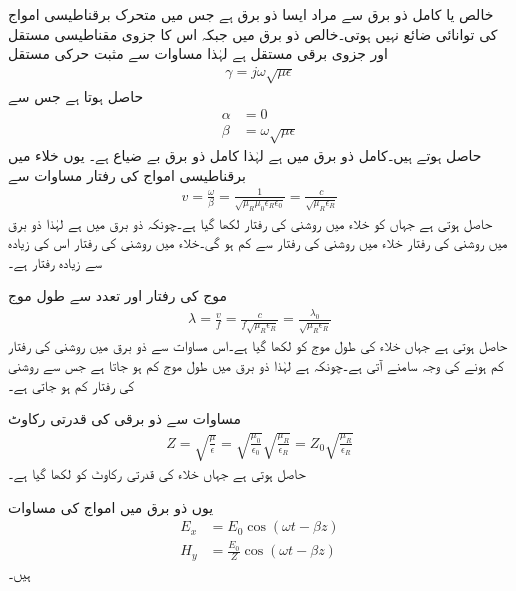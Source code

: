 خالص یا کامل ذو برق سے مراد ایسا ذو برق ہے جس میں متحرک برقناطیسی امواج کی توانائی ضائع نہیں ہوتی۔خالص ذو برق میں  جبکہ اس کا جزوی مقناطیسی مستقل  اور جزوی برقی مستقل   ہے لہٰذا مساوات  سے مثبت حرکی مستقل
\begin{align*}
\gamma=j \omega \sqrt{\mu \epsilon }
\end{align*}
حاصل ہوتا ہے جس سے
\begin{align}
\alpha&=0\\
\beta&=\omega \sqrt{\mu \epsilon} \label{مساوات_موج_کامل-ذوبرق_بیٹا}
\end{align}
حاصل ہوتے ہیں۔کامل ذو برق میں  ہے لہٰذا کامل ذو برق بے ضیاع ہے۔ یوں خلاء میں برقناطیسی امواج کی رفتار  مساوات  سے
\begin{align}
v=\frac{\omega}{\beta}=\frac{1}{\sqrt{\mu_R \mu_0 \epsilon_R \epsilon_0}}=\frac{c}{\sqrt{\mu_R \epsilon_R}}
\end{align} 
حاصل ہوتی ہے جہاں  کو خلاء میں روشنی کی رفتار  لکھا گیا ہے۔چونکہ ذو برق میں  ہے  لہٰذا ذو برق میں روشنی کی رفتار خلاء میں روشنی کی رفتار سے کم ہو گی۔خلاء میں روشنی کی رفتار اس کی زیادہ سے زیادہ رفتار ہے۔

موج کی رفتار اور تعدد سے طول موج
\begin{align}
\lambda=\frac{v}{f}=\frac{c}{f \sqrt{\mu_R \epsilon_R}}=\frac{\lambda_0}{\sqrt{\mu_R \epsilon_R}}
\end{align}
حاصل ہوتی ہے جہاں خلاء کی طول موج کو  لکھا گیا ہے۔اس مساوات سے ذو برق میں روشنی کی رفتار کم ہونے کی وجہ سامنے آتی ہے۔چونکہ  ہے لہٰذا ذو برق میں طول موج کم ہو جاتا ہے جس سے روشنی کی رفتار کم ہو جاتی ہے۔


مساوات  سے ذو برقی کی  قدرتی رکاوٹ
\begin{align*}
Z =\sqrt{\frac{\mu}{\epsilon}}=\sqrt{\frac{\mu_0}{\epsilon_0}}\sqrt{\frac{\mu_R}{\epsilon_R}}= Z_0 \sqrt{\frac{\mu_R}{\epsilon_R}}
\end{align*}
حاصل ہوتی ہے جہاں خلاء کی قدرتی رکاوٹ کو  لکھا گیا ہے۔

یوں ذو برق میں امواج کی مساوات
\begin{align}
E_x&=E_0 \cos (\omega t -\beta z)\\
H_y&=\frac{E_0}{Z} \cos (\omega t -\beta z)
\end{align}
ہیں۔


